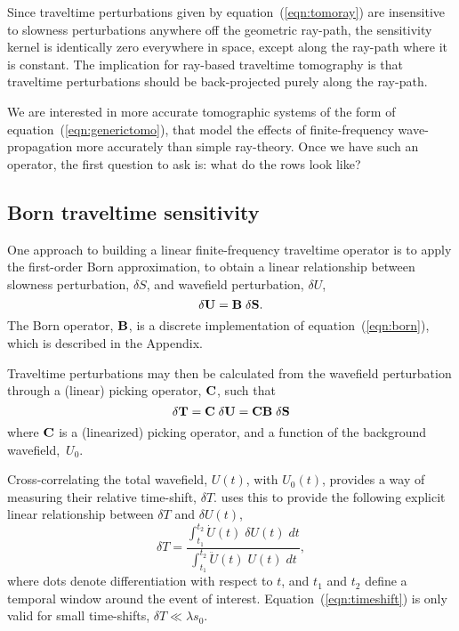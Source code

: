 \par
Since traveltime perturbations given by equation~(\ref{eqn:tomoray})
are insensitive to slowness perturbations anywhere off the geometric
ray-path, the sensitivity kernel is identically zero everywhere in
space, except along the ray-path where it is constant.
The implication for ray-based traveltime tomography is that traveltime
perturbations should be back-projected purely along the ray-path.

\par
We are interested in more accurate tomographic systems of the form 
of equation~(\ref{eqn:generictomo}), that model the effects of
finite-frequency wave-propagation more accurately than simple
ray-theory. 
Once we have such an operator, the first question to ask is: what
do the rows look like?

\subsection{Born traveltime sensitivity}
One approach to building a linear finite-frequency traveltime operator
is to apply the first-order Born approximation, to obtain a linear
relationship between slowness perturbation, $\delta S$, and wavefield
perturbation, $\delta U$,
\begin{equation}
{\bf \delta U} = {\bf B \; \delta S}.
\end{equation}
The Born operator, ${\bf B}$, is a discrete implementation of
equation~(\ref{eqn:born}), which is described in the Appendix. 

\par
Traveltime perturbations may then be calculated from the wavefield
perturbation through a (linear) picking operator, ${\bf C}$, such that 
\begin{equation}
{\bf \delta T} = {\bf C \; \delta U} = {\bf C B \; \delta S}
\end{equation}
where ${\bf C}$ is a (linearized) picking operator, and a function
of the background wavefield,~$U_0$. 

\par
Cross-correlating the total wavefield, $U(t)$, with $U_0(t)$, provides
a way of measuring their relative 
time-shift, $\delta T$.  \cite{marquering99} uses
this to provide the following explicit linear relationship between
$\delta T$ and $\delta U(t)$,
\begin{equation} \label{eqn:timeshift}
\delta T = 
\frac{\int_{t_1}^{t_2} {\dot U}(t) \; \delta U(t) \; dt}
{\int_{t_1}^{t_2} {\ddot U}(t) \; U(t) \; dt},
\end{equation}
where dots denote differentiation with respect to $t$, and $t_1$ and
$t_2$ define a temporal window around the event of interest. 
Equation~(\ref{eqn:timeshift}) is only valid for small time-shifts,
$\delta T \ll \lambda s_0$.

